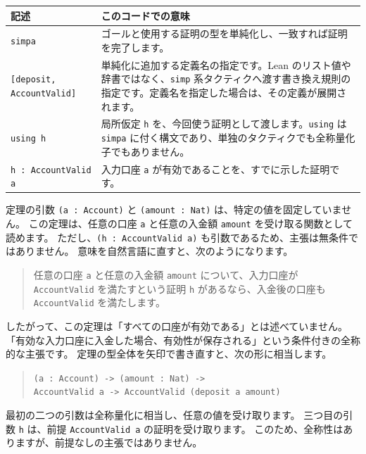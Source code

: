 \begin{center}
\begin{tabular}{p{}p{}}
\toprule
記述 & このコードでの意味 \\
\midrule
\texttt{simpa} & ゴールと使用する証明の型を単純化し、一致すれば証明を完了します。 \\
\texttt{[deposit, AccountValid]} & 単純化に追加する定義名の指定です。Lean のリスト値や辞書ではなく、\texttt{simp} 系タクティクへ渡す書き換え規則の指定です。定義名を指定した場合は、その定義が展開されます。 \\
\texttt{using h} & 局所仮定 \texttt{h} を、今回使う証明として渡します。\texttt{using} は \texttt{simpa} に付く構文であり、単独のタクティクでも全称量化子でもありません。 \\
\texttt{h : AccountValid a} & 入力口座 \texttt{a} が有効であることを、すでに示した証明です。 \\
\bottomrule
\end{tabular}
\end{center}

定理の引数 \texttt{(a : Account)} と \texttt{(amount : Nat)} は、特定の値を固定していません。
この定理は、任意の口座 \texttt{a} と任意の入金額 \texttt{amount} を受け取る関数として読めます。
ただし、\texttt{(h : AccountValid a)} も引数であるため、主張は無条件ではありません。
意味を自然言語に直すと、次のようになります。

\begin{quote}
任意の口座 \texttt{a} と任意の入金額 \texttt{amount} について、入力口座が \texttt{AccountValid} を満たすという証明 \texttt{h} があるなら、入金後の口座も \texttt{AccountValid} を満たします。
\end{quote}

したがって、この定理は「すべての口座が有効である」とは述べていません。
「有効な入力口座に入金した場合、有効性が保存される」という条件付きの全称的な主張です。
定理の型全体を矢印で書き直すと、次の形に相当します。

\begin{quote}
\texttt{(a : Account) -> (amount : Nat) ->}\\
\texttt{AccountValid a -> AccountValid (deposit a amount)}
\end{quote}

最初の二つの引数は全称量化に相当し、任意の値を受け取ります。
三つ目の引数 \texttt{h} は、前提 \texttt{AccountValid a} の証明を受け取ります。
このため、全称性はありますが、前提なしの主張ではありません。

